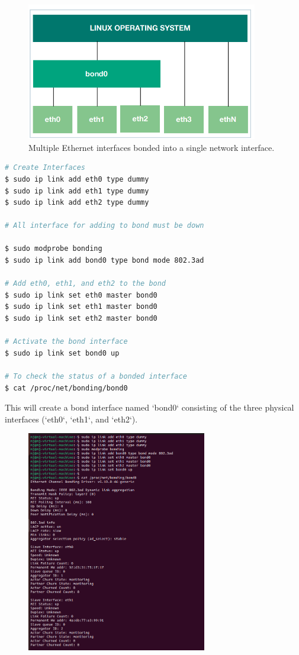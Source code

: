 \documentclass{report}
\begin{document}
\begin{figure}[h] 
  \centering 
  \includegraphics[width=0.9\textwidth]{21.png} 
  \captionsetup{labelformat=empty}
  \caption{Multiple Ethernet interfaces bonded into a single network interface.\cite{5}}
\end{figure} 

\begin{lstlisting}[language=bash]
# Create Interfaces
$ sudo ip link add eth0 type dummy
$ sudo ip link add eth1 type dummy
$ sudo ip link add eth2 type dummy

# All interface for adding to bond must be down

$ sudo modprobe bonding
$ sudo ip link add bond0 type bond mode 802.3ad

# Add eth0, eth1, and eth2 to the bond
$ sudo ip link set eth0 master bond0
$ sudo ip link set eth1 master bond0
$ sudo ip link set eth2 master bond0

# Activate the bond interface
$ sudo ip link set bond0 up

# To check the status of a bonded interface
$ cat /proc/net/bonding/bond0
\end{lstlisting}

This will create a bond interface named `bond0` consisting of the three physical interfaces (`eth0`, `eth1`, and `eth2`).

\begin{figure}[h] 
  \centering 
  \includegraphics[width=0.7\textwidth]{13.png}
\end{figure} 
\end{document}

